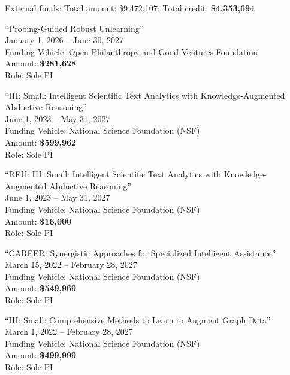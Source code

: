 \documentclass[10pt]{article}
\newenvironment{myindentpar}[1]%
{\begin{list}{}%
         {\setlength{\leftmargin}{#1}}%
         \item[]%
}
{\end{list}}
\newcounter{list}
\begin{document}
\begin{myindentpar}{0.75cm}

\hspace{-0.75cm}External funds: Total amount: \$9,472,107; Total credit: \textbf{\$4,353,694}

\hspace{-0.75cm}``Probing-Guided Robust Unlearning'' \\
January 1, 2026 -- June 30, 2027 \\
Funding Vehicle: Open Philanthropy and Good Ventures Foundation \\
Amount: \textbf{\$281,628} \\
Role: {Sole PI}

\hspace{-0.75cm}``III: Small: Intelligent Scientific Text Analytics with Knowledge-Augmented Abductive Reasoning'' \\
June 1, 2023 -- May 31, 2027 \\
Funding Vehicle: National Science Foundation (NSF) \\
Amount: \textbf{\$599,962} \\
Role: {Sole PI}

\hspace{-0.75cm}``REU: III: Small: Intelligent Scientific Text Analytics with Knowledge-Augmented Abductive Reasoning'' \\
June 1, 2023 -- May 31, 2027 \\
Funding Vehicle: National Science Foundation (NSF) \\
Amount: \textbf{\$16,000} \\
Role: {Sole PI}

\hspace{-0.75cm}``CAREER: Synergistic Approaches for Specialized Intelligent Assistance'' \\
March 15, 2022 -- February 28, 2027 \\
Funding Vehicle: National Science Foundation (NSF) \\
Amount: \textbf{\$549,969} \\
Role: {Sole PI}

\hspace{-0.75cm}``III: Small: Comprehensive Methods to Learn to Augment Graph Data'' \\
March 1, 2022 -- February 28, 2027 \\
Funding Vehicle: National Science Foundation (NSF) \\
Amount: \textbf{\$499,999} \\
Role: {Sole PI}


\end{myindentpar}
\end{document}

